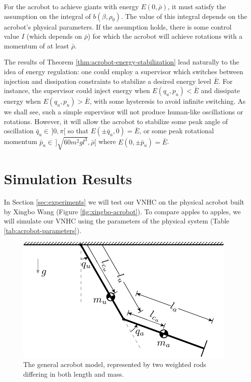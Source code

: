 \documentclass[journal,twoside,web]{ieeecolor}
\begin{document}
For the acrobot to achieve giants with energy
\(E(0,\bar{\rho})\), it must satisfy the assumption on the integral
of \(b(\beta,\rho_0)\). 
The value of this integral depends on the acrobot's physical parameters.
If the assumption holds, there is some control value \(I\)
(which depends on \(\bar{\rho}\)) for which the acrobot will 
achieve rotations with a momentum of at least \(\bar{\rho}\).

The results of Theorem \ref{thm:acrobot-energy-stabilization} lead naturally to
the idea of energy regulation: one could employ a supervisor which switches
between injection and dissipation constraints to stabilize a desired energy
level \(\bar{E}\).
For instance, the supervisor could inject energy when \(E(q_u,p_u) < \bar{E}\) 
and dissipate energy when \(E(q_u,p_u) > \bar{E}\), with some hysteresis to
avoid infinite switching.
As we shall see, such a simple supervisor will not produce human-like
oscillations or rotations.
However, it will allow the acrobot to stabilize some peak angle of oscillation
\(\bar{q}_u \in \, ]0,\pi[\) so that \(E(\pm \bar{q}_u,0) = \bar{E}\),
or some peak rotational momentum
\(\bar{p}_u \in \, ]\sqrt{60m^2gl^3}, \bar{\rho}[\) where
\(E(0,\pm \bar{p}_u) = \bar{E}\).

\section{Simulation Results}\label{sec:simulations}
In Section \ref{sec:experiments} we will test our VNHC on the physical acrobot
built by Xingbo Wang \cite{xingbo_thesis} (Figure \ref{fig:xingbo-acrobot}).
To compare apples to apples, we will simulate our VNHC using the parameters of
the physical system (Table \ref{tab:acrobot-parameters}).

\begin{figure}
    \centering
    \includegraphics[width=0.8\linewidth]{acrobot_model.pdf}
    \caption{The general acrobot model, represented by two weighted rods
    differing in both length and mass.}%
    \label{fig:acrobot-model}
\end{figure}
\end{document}
